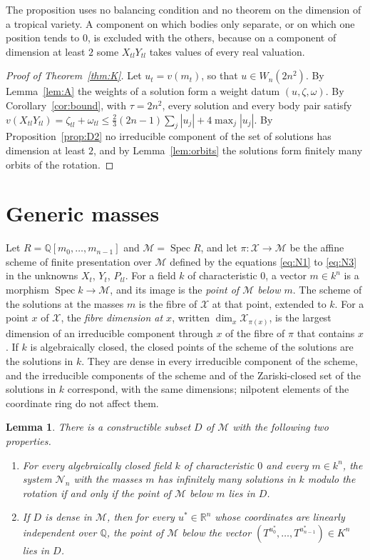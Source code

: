 \documentclass[11pt]{amsart}
\newtheorem{lemma}[theorem]{Lemma}
\theoremstyle{definition}
\theoremstyle{remark}
\numberwithin{equation}{section}
\newcommand{\QQ}{\mathbb{Q}}
\newcommand{\RR}{\mathbb{R}}
\newcommand{\cN}{\mathcal{N}}
\newcommand{\cX}{\mathcal{X}}
\newcommand{\cM}{\mathcal{M}}
\DeclareMathOperator{\Spec}{Spec}
\begin{document}
The proposition uses no balancing condition and no theorem on the dimension of a tropical variety. A
component on which bodies only separate, or on which one position tends to $0$, is excluded with the
others, because on a component of dimension at least $2$ some $X_{tl} Y_{tl}$ takes values of every real
valuation.

\begin{proof}[Proof of Theorem~\ref{thm:K}]
Let $u_t = v(m_t)$, so that $u \in W_n(2n^2)$. By Lemma~\ref{lem:A} the weights of a solution form a
weight datum $(u, \zeta, \omega)$. By Corollary~\ref{cor:bound}, with $\tau = 2n^2$, every solution and
every body pair satisfy
$v(X_{tl} Y_{tl}) = \zeta_{tl} + \omega_{tl} \le \tfrac23 (2n - 1) \sum_j |u_j| + 4 \max_j |u_j|$. By
Proposition~\ref{prop:D2} no irreducible component of the set of solutions has dimension at least $2$,
and by Lemma~\ref{lem:orbits} the solutions form finitely many orbits of the rotation.
\end{proof}

\section{Generic masses}\label{sec:generic}

Let $R = \QQ[m_0, \dots, m_{n-1}]$ and $\cM = \Spec R$, and let $\pi \colon \cX \to \cM$ be the affine
scheme of finite presentation over $\cM$ defined by the equations \eqref{eq:N1} to \eqref{eq:N3} in the
unknowns $X_t$, $Y_t$, $P_{tl}$. For a field $k$ of characteristic $0$, a vector $m \in k^n$ is a
morphism $\Spec k \to \cM$, and its image is the \emph{point of $\cM$ below $m$}. The scheme of the
solutions at the masses $m$ is the fibre of $\cX$ at that point, extended to $k$. For a point $x$ of
$\cX$, the \emph{fibre dimension at $x$}, written $\dim_x \cX_{\pi(x)}$, is the largest dimension of an
irreducible component through $x$ of the fibre of $\pi$ that contains $x$. If $k$ is algebraically
closed, the closed points of the scheme of the solutions are the solutions in $k$. They are dense in
every irreducible component of the scheme, and the irreducible components of the scheme and of the
Zariski-closed set of the solutions in $k$ correspond, with the same dimensions; nilpotent elements of
the coordinate ring do not affect them.

\begin{lemma}\label{lem:D0}
There is a constructible subset $D$ of $\cM$ with the following two properties.
\begin{enumerate}
\item[(a)] For every algebraically closed field $k$ of characteristic $0$ and every $m \in k^n$, the
system $\cN_n$ with the masses $m$ has infinitely many solutions in $k$ modulo the rotation if and only
if the point of $\cM$ below $m$ lies in $D$.
\item[(b)] If $D$ is dense in $\cM$, then for every $u^{*} \in \RR^n$ whose coordinates are linearly
independent over $\QQ$, the point of $\cM$ below the vector
$(T^{u^{*}_0}, \dots, T^{u^{*}_{n-1}}) \in K^n$ lies in $D$.
\end{enumerate}
\end{lemma}
\end{document}
